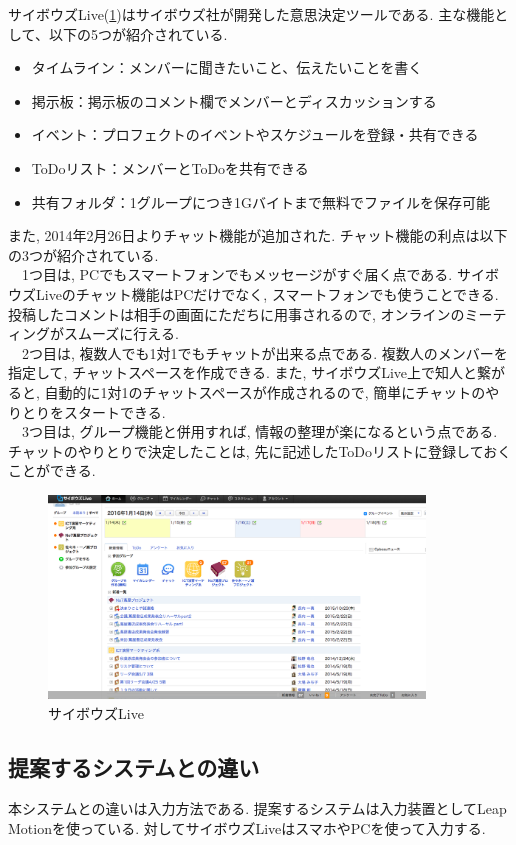 \documentclass{funthesis}
\begin{document}
サイボウズLive(\ref{cybozu})はサイボウズ社が開発した意思決定ツールである. 
主な機能として、以下の5つが紹介されている.
\begin{itemize}
 \item タイムライン：メンバーに聞きたいこと、伝えたいことを書く
 \item 掲示板：掲示板のコメント欄でメンバーとディスカッションする
 \item イベント：プロフェクトのイベントやスケジュールを登録・共有できる
 \item ToDoリスト：メンバーとToDoを共有できる
 \item 共有フォルダ：1グループにつき1Gバイトまで無料でファイルを保存可能
\end{itemize}
また, 2014年2月26日よりチャット機能が追加された. チャット機能の利点は以下の3つが紹介されている.\\
　1つ目は, PCでもスマートフォンでもメッセージがすぐ届く点である. サイボウズLiveのチャット機能はPCだけでなく, スマートフォンでも使うことできる. 投稿したコメントは相手の画面にただちに用事されるので, オンラインのミーティングがスムーズに行える. \\
　2つ目は,  複数人でも1対1でもチャットが出来る点である. 複数人のメンバーを指定して, チャットスペースを作成できる. また, サイボウズLive上で知人と繋がると, 自動的に1対1のチャットスペースが作成されるので, 簡単にチャットのやりとりをスタートできる. \\
　3つ目は,  グループ機能と併用すれば, 情報の整理が楽になるという点である. チャットのやりとりで決定したことは, 先に記述したToDoリストに登録しておくことができる. \\
\begin{figure}[H]
 \begin{center}
  \includegraphics[width=100mm]{./img/cybozulive.png}
 \end{center}
 \caption{サイボウズLive}
 \label{cybozu}
\end{figure}

\subsection{提案するシステムとの違い}
本システムとの違いは入力方法である. 提案するシステムは入力装置としてLeap Motionを使っている. 対してサイボウズLiveはスマホやPCを使って入力する. 
\end{document}
